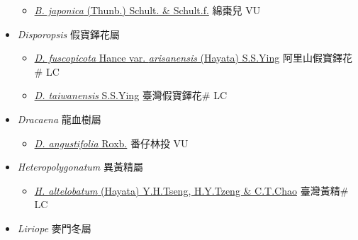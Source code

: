 \begin{itemize}
  \begin{itemize}
        \item[] \href{http://www.theplantlist.org/tpl1.1/search?q=Barnardia+japonica}{\textit{B. japonica} (Thunb.) Schult. \& Schult.f.}     綿棗兒 VU
  \end{itemize}
 \item[] \textit{Disporopsis} 假寶鐸花屬
                    
  \begin{itemize}
        \item[] \href{http://www.theplantlist.org/tpl1.1/search?q=Disporopsis+fuscopicota+var.+arisanensis}{\textit{D. fuscopicota} Hance var. \textit{arisanensis} (Hayata) S.S.Ying}   阿里山假寶鐸花\# LC
        \item[] \href{http://www.theplantlist.org/tpl1.1/search?q=Disporopsis+taiwanensis}{\textit{D. taiwanensis} S.S.Ying}   臺灣假寶鐸花\# LC
  \end{itemize}
 \item[] \textit{Dracaena} 龍血樹屬
                    
  \begin{itemize}
        \item[] \href{http://www.theplantlist.org/tpl1.1/search?q=Dracaena+angustifolia}{\textit{D. angustifolia} Roxb.}   番仔林投 VU
  \end{itemize}
 \item[] \textit{Heteropolygonatum} 異黃精屬
                    
  \begin{itemize}
        \item[] \href{http://www.theplantlist.org/tpl1.1/search?q=Heteropolygonatum+altelobatum}{\textit{H. altelobatum} (Hayata) Y.H.Tseng, H.Y.Tzeng \& C.T.Chao}     臺灣黃精\# LC
  \end{itemize}
 \item[] \textit{Liriope} 麥門冬屬
                    

\end{itemize}
